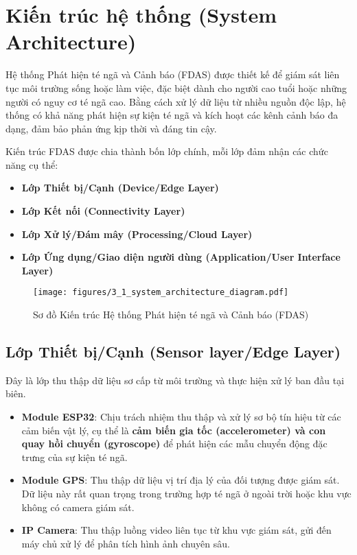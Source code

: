 
\section{Kiến trúc hệ thống (System Architecture)}
\label{sec:system_architecture}

Hệ thống Phát hiện té ngã và Cảnh báo (FDAS) được thiết kế để giám sát liên tục môi trường sống hoặc làm việc, đặc biệt dành cho người cao tuổi hoặc những người có nguy cơ té ngã cao. Bằng cách xử lý dữ liệu từ nhiều nguồn độc lập, hệ thống có khả năng phát hiện sự kiện té ngã và kích hoạt các kênh cảnh báo đa dạng, đảm bảo phản ứng kịp thời và đáng tin cậy.

Kiến trúc FDAS được chia thành bốn lớp chính, mỗi lớp đảm nhận các chức năng cụ thể: 
\begin{itemize}
    \item \textbf{Lớp Thiết bị\slash Cạnh (Device\slash Edge Layer)} 
    \item \textbf{Lớp Kết nối (Connectivity Layer)}
    \item \textbf{Lớp Xử lý\slash Đám mây (Processing\slash Cloud Layer)}
    \item \textbf{Lớp Ứng dụng\slash Giao diện người dùng (Application\slash User Interface Layer)}
\end{itemize}

\begin{figure}[H]
    \centering
    \texttt{[image: figures/3\_1\_system\_architecture\_diagram.pdf]}
    \caption{Sơ đồ Kiến trúc Hệ thống Phát hiện té ngã và Cảnh báo (FDAS)}
    \label{fig:system_architecture}
\end{figure}

\subsection{Lớp Thiết bị\slash Cạnh (Sensor layer\slash Edge Layer)}
Đây là lớp thu thập dữ liệu sơ cấp từ môi trường và thực hiện xử lý ban đầu tại biên.
\begin{itemize}
    \item \textbf{Module ESP32}: Chịu trách nhiệm thu thập và xử lý sơ bộ tín hiệu từ các cảm biến vật lý, cụ thể là \textbf{cảm biến gia tốc (accelerometer) và con quay hồi chuyển (gyroscope)} để phát hiện các mẫu chuyển động đặc trưng của sự kiện té ngã.
    \item \textbf{Module GPS}: Thu thập dữ liệu vị trí địa lý của đối tượng được giám sát. Dữ liệu này rất quan trọng trong trường hợp té ngã ở ngoài trời hoặc khu vực không có camera giám sát.
    \item \textbf{IP Camera}: Thu thập luồng video liên tục từ khu vực giám sát, gửi đến máy chủ xử lý để phân tích hình ảnh chuyên sâu.
\end{itemize}

